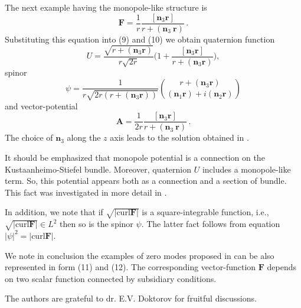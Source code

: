 \documentclass[12pt,a4paper]{article}
\begin{document}
The next example having the monopole-like structure is
\begin{displaymath}
\mathbf{F}=\frac{1}{r}
\frac{[\mathbf{n}_3\mathbf{r}]}{r+(\mathbf{n}_3\
\mathbf{r})}\, .
\end{displaymath}
Substituting this equation into (9) and (10) we obtain quaternion function
\begin{displaymath}
U=\frac{\sqrt{r+(\mathbf{n}_3\mathbf{r})}}{r\sqrt{2r}}\biggl(1+
\frac{[\mathbf{n}_3\mathbf{r}]}{r+(\mathbf{n}_3\mathbf{r})}
\biggr),
\end{displaymath}
spinor
\begin{displaymath}
\psi=\frac{1}{r\sqrt{2r(r+(\mathbf{n}_3\mathbf{r}))}}
{r+(\mathbf{n}_3\mathbf{r}) \choose (\mathbf{n}_1\mathbf{r})+i(\mathbf{n}_2\mathbf{r})}
\end{displaymath}
and vector-potential
\begin{displaymath}
\mathbf{A}=\frac{1}{2r}
\frac{[\mathbf{n}_3\mathbf{r}]}{r+(\mathbf{n}_3\
\mathbf{r})}\, .
\end{displaymath}
The choice of $\mathbf{n}_3$ along the $z$ axis  leads to the solution obtained in \cite{Freund}.

It should be emphasized that monopole potential is a connection on the
Kustaanheimo-Stiefel bundle. Moreover, quaternion $U$ includes a monopole-like term.
So, this potential appears both as a connection and a section of bundle.
This fact was investigated in more detail in \cite{Pris1}.

In addition, we note
that if $\sqrt{|\mathrm{curl}\mathbf{F}|}$ is a square-integrable function, i.e.,
$\sqrt{|\mathrm{curl}\mathbf{F}|}\in L^2$ then so is the spinor $\psi$. The
latter fact follows from equation $|\psi|^2=|\mathrm{curl}\mathbf{F}|$.

We note in conclusion the examples of zero modes proposed in \cite{Elton} can
be also represented in form (11) and (12). The corresponding vector-function
$\mathbf{F}$ depends on two scalar function connected by subsidiary
conditions.

The authors are grateful to dr. E.V. Doktorov for fruitful discussions.
\end{document}
